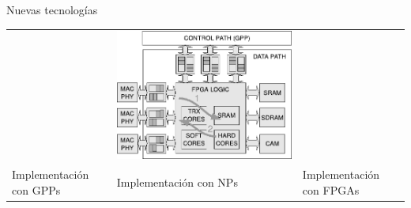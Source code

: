 \documentclass[xcolor=dvipsnames]{beamer}
\begin{document}
\begin{frame}{Nuevas tecnologías}
\begin{tabularx}{\linewidth}{VVV}
      &
      \includegraphics[scale=0.38]{figures/FPGA_based}
      \\
      \tiny Implementación con GPPs
      &
      \tiny Implementación con NPs
      &
      \tiny Implementación con FPGAs
      \\
    \end{tabularx}
\end{frame}
\end{document}
